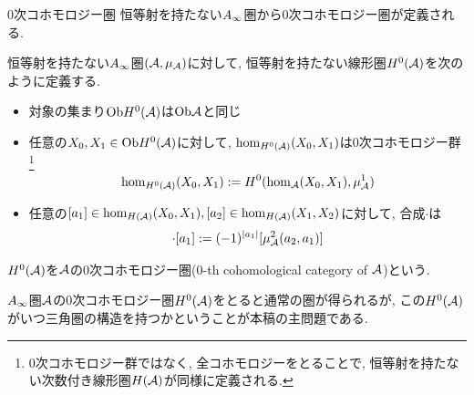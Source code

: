 \documentclass[aspectratio=169, dvipdfmx, 8pt, notheorems, uplatex]{beamer}
\begin{document}
\begin{frame}{$0$次コホモロジー圏}
  恒等射を持たない$A_\infty$圏から$0$次コホモロジー圏が定義される. 
  
  \begin{definition}[$0$次コホモロジー圏]
    恒等射を持たない$A_\infty$圏$(\mathcal{A},\mu_{\mathcal{A}})$に対して, 恒等射を持たない線形圏$H^0(\mathcal{A})$を次のように定義する. 
    \begin{itemize}
      \item 対象の集まり$\mathrm{Ob} H^0(\mathcal{A})$は$\mathrm{Ob}\mathcal{A}$と同じ
      \item 任意の$X_0, X_1 \in \mathrm{Ob} H^0(\mathcal{A})$に対して, $\hom_{H^0(\mathcal{A})}(X_0,X_1)$は$0$次コホモロジー群
      \footnote{
        $0$次コホモロジー群ではなく, 全コホモロジーをとることで, 恒等射を持たない次数付き線形圏$H(\mathcal{A})$が同様に定義される. 
      }
      \begin{align*}
        \hom_{H^0(\mathcal{A})}(X_0,X_1) := H^0(\hom_{\mathcal{A}}(X_0,X_1), \mu^1_{\mathcal{A}})
      \end{align*}
      \item 任意の$[a_1] \in \hom_{H(\mathcal{A})}(X_0,X_1), [a_2] \in \hom_{H(\mathcal{A})}(X_1,X_2)$に対して, 合成$\cdot$は
      \begin{align*}
        [a_2] \cdot [a_1] := (-1)^{|a_1|} [\mu^2_\A(a_2,a_1)]
      \end{align*}
    \end{itemize}
    $H^0(\mathcal{A})$を$\mathcal{A}$の$0$次コホモロジー圏($0$-th cohomological category of $\mathcal{A}$)という. 
  \end{definition}

  $A_\infty$圏$\mathcal{A}$の$0$次コホモロジー圏$H^0(\mathcal{A})$をとると通常の圏が得られるが, この$H^0(\mathcal{A})$がいつ三角圏の構造を持つかということが本稿の主問題である. 
\end{frame}
\end{document}
